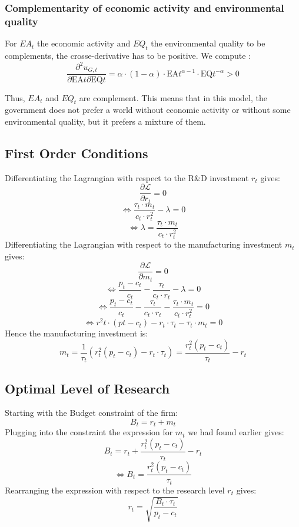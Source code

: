 \documentclass{article}
\begin{document}
\subsubsection{Complementarity of economic activity and environmental quality}
\label{sec:properties_utility_function_gov_2}

For $EA_{t}$ the economic activity and $EQ_{t}$ the environmental quality to be complements, the crosse-derivative has to be positive. 
We compute :  
$$\frac{\partial^2 u_{G,t}}{\partial \text{EA}{t} \partial \text{EQ}{t}}=\alpha\cdot(1-\alpha)\cdot\text{EA}{t}^{\alpha-1}\cdot\text{EQ}{t}^{-\alpha}>0$$

Thus, $EA_{t}$ and $EQ_{t}$ are complement. This means that in this model, the government does not prefer a world without economic activity or without some environmental quality, but it prefers a mixture of them. 

\subsection{First Order Conditions}
\label{sec:proof3}
Differentiating the Lagrangian with respect to the R\&D investment $r_{t}$ gives:
$$\frac{\partial \mathcal{L}}{\partial r_{t}}=0$$
$$\Leftrightarrow\frac{\tau_{t}\cdot m_{t}}{c_{t}\cdot r^{2}_{t}}-\lambda=0$$
$$\Leftrightarrow\lambda=\frac{\tau_{t}\cdot m_{t}}{c_{t}\cdot r^{2}_{t}}$$
Differentiating the Lagrangian with respect to the manufacturing investment $m_{t}$ gives:
$$\frac{\partial \mathcal{L}}{\partial m_{t}}=0$$
$$\Leftrightarrow\frac{p_{t}-c_{t}}{c_{t}}-\frac{\tau_{t}}{c_{t}\cdot r_{t}}-\lambda=0$$
$$\Leftrightarrow\frac{p_{t}-c_{t}}{c_{t}}-\frac{\tau_{t}}{c_{t}\cdot r_{t}}-\frac{\tau_{t}\cdot m_{t}}{c_{t}\cdot r^{2}_{t}}=0$$
$$\Leftrightarrow{r^{2}{t}}\cdot(p{t}-c_{t})-r_{t}\cdot \tau_{t}-\tau_{t}\cdot m_{t}=0$$
Hence the manufacturing investment is:
\begin{equation}\tag{5}
    m_{t}=\frac{1}{\tau_{t}}\left(r_{t}^{2}(p_{t}-c_{t})-r_{t}\cdot \tau_{t}\right)=\frac{r_{t}^{2}\left(p_{t}-c_{t}\right)}{\tau_{t}}-r_{t}
\end{equation}

\subsection{Optimal Level of Research}
\label{sec:proof4}
Starting with the Budget constraint of the firm:
$$B_{t}=r_{t}+m_{t}$$
Plugging into the constraint the expression for $m_{t}$ we had found earlier gives:
$$B_{t}=r_{t}+\frac{r_{t}^{2}\left(p_{t}-c_{t}\right)}{\tau_{t}}-r_{t}$$
$$\Leftrightarrow{B_{t}=\frac{r_{t}^{2}\left(p_{t}-c_{t}\right)}{\tau_{t}}}$$
Rearranging the expression with respect to the research level ${r_{t}}$ gives:
\begin{equation}\tag{6}
    r_{t}=\sqrt{\frac{B_{t}\cdot \tau_{t}}{p_{t}-c_{t}}}
\end{equation}
\end{document}
